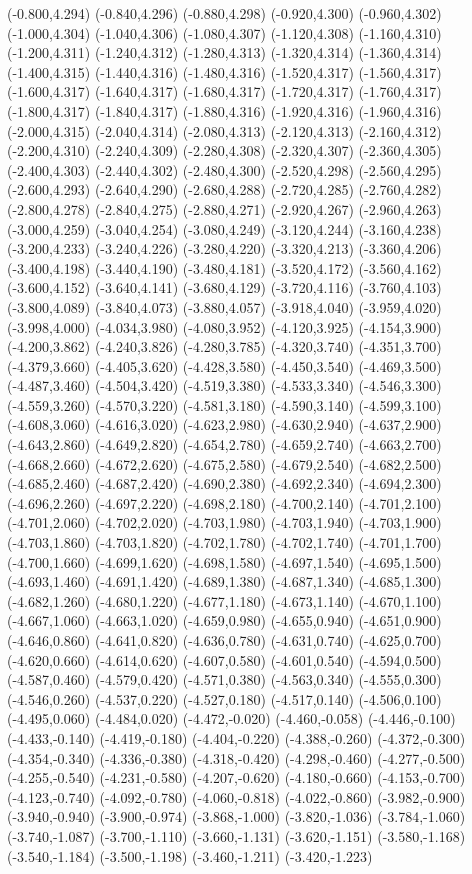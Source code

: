 (-0.800,4.294) (-0.840,4.296) (-0.880,4.298) (-0.920,4.300) (-0.960,4.302) (-1.000,4.304) (-1.040,4.306) (-1.080,4.307) (-1.120,4.308) (-1.160,4.310) (-1.200,4.311) (-1.240,4.312) (-1.280,4.313) (-1.320,4.314) (-1.360,4.314) (-1.400,4.315) (-1.440,4.316) (-1.480,4.316) (-1.520,4.317) (-1.560,4.317) (-1.600,4.317) (-1.640,4.317) (-1.680,4.317) (-1.720,4.317) (-1.760,4.317) (-1.800,4.317) (-1.840,4.317) (-1.880,4.316) (-1.920,4.316) (-1.960,4.316) (-2.000,4.315) (-2.040,4.314) (-2.080,4.313) (-2.120,4.313) (-2.160,4.312) (-2.200,4.310) (-2.240,4.309) (-2.280,4.308) (-2.320,4.307) (-2.360,4.305) (-2.400,4.303) (-2.440,4.302) (-2.480,4.300) (-2.520,4.298) (-2.560,4.295) (-2.600,4.293) (-2.640,4.290) (-2.680,4.288) (-2.720,4.285) (-2.760,4.282) (-2.800,4.278) (-2.840,4.275) (-2.880,4.271) (-2.920,4.267) (-2.960,4.263) (-3.000,4.259) (-3.040,4.254) (-3.080,4.249) (-3.120,4.244) (-3.160,4.238) (-3.200,4.233) (-3.240,4.226) (-3.280,4.220) (-3.320,4.213) (-3.360,4.206) (-3.400,4.198) (-3.440,4.190) (-3.480,4.181) (-3.520,4.172) (-3.560,4.162) (-3.600,4.152) (-3.640,4.141) (-3.680,4.129) (-3.720,4.116) (-3.760,4.103) (-3.800,4.089) (-3.840,4.073) (-3.880,4.057) (-3.918,4.040) (-3.959,4.020) (-3.998,4.000) (-4.034,3.980) (-4.080,3.952) (-4.120,3.925) (-4.154,3.900) (-4.200,3.862) (-4.240,3.826) (-4.280,3.785) (-4.320,3.740) (-4.351,3.700) (-4.379,3.660) (-4.405,3.620) (-4.428,3.580) (-4.450,3.540) (-4.469,3.500) (-4.487,3.460) (-4.504,3.420) (-4.519,3.380) (-4.533,3.340) (-4.546,3.300) (-4.559,3.260) (-4.570,3.220) (-4.581,3.180) (-4.590,3.140) (-4.599,3.100) (-4.608,3.060) (-4.616,3.020) (-4.623,2.980) (-4.630,2.940) (-4.637,2.900) (-4.643,2.860) (-4.649,2.820) (-4.654,2.780) (-4.659,2.740) (-4.663,2.700) (-4.668,2.660) (-4.672,2.620) (-4.675,2.580) (-4.679,2.540) (-4.682,2.500) (-4.685,2.460) (-4.687,2.420) (-4.690,2.380) (-4.692,2.340) (-4.694,2.300) (-4.696,2.260) (-4.697,2.220) (-4.698,2.180) (-4.700,2.140) (-4.701,2.100) (-4.701,2.060) (-4.702,2.020) (-4.703,1.980) (-4.703,1.940) (-4.703,1.900) (-4.703,1.860) (-4.703,1.820) (-4.702,1.780) (-4.702,1.740) (-4.701,1.700) (-4.700,1.660) (-4.699,1.620) (-4.698,1.580) (-4.697,1.540) (-4.695,1.500) (-4.693,1.460) (-4.691,1.420) (-4.689,1.380) (-4.687,1.340) (-4.685,1.300) (-4.682,1.260) (-4.680,1.220) (-4.677,1.180) (-4.673,1.140) (-4.670,1.100) (-4.667,1.060) (-4.663,1.020) (-4.659,0.980) (-4.655,0.940) (-4.651,0.900) (-4.646,0.860) (-4.641,0.820) (-4.636,0.780) (-4.631,0.740) (-4.625,0.700) (-4.620,0.660) (-4.614,0.620) (-4.607,0.580) (-4.601,0.540) (-4.594,0.500) (-4.587,0.460) (-4.579,0.420) (-4.571,0.380) (-4.563,0.340) (-4.555,0.300) (-4.546,0.260) (-4.537,0.220) (-4.527,0.180) (-4.517,0.140) (-4.506,0.100) (-4.495,0.060) (-4.484,0.020) (-4.472,-0.020) (-4.460,-0.058) (-4.446,-0.100) (-4.433,-0.140) (-4.419,-0.180) (-4.404,-0.220) (-4.388,-0.260) (-4.372,-0.300) (-4.354,-0.340) (-4.336,-0.380) (-4.318,-0.420) (-4.298,-0.460) (-4.277,-0.500) (-4.255,-0.540) (-4.231,-0.580) (-4.207,-0.620) (-4.180,-0.660) (-4.153,-0.700) (-4.123,-0.740) (-4.092,-0.780) (-4.060,-0.818) (-4.022,-0.860) (-3.982,-0.900) (-3.940,-0.940) (-3.900,-0.974) (-3.868,-1.000) (-3.820,-1.036) (-3.784,-1.060) (-3.740,-1.087) (-3.700,-1.110) (-3.660,-1.131) (-3.620,-1.151) (-3.580,-1.168) (-3.540,-1.184) (-3.500,-1.198) (-3.460,-1.211) (-3.420,-1.223) 